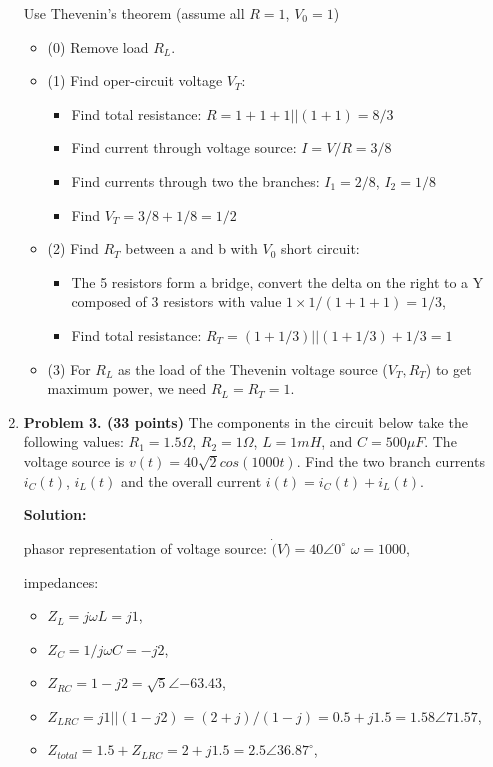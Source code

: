 \begin{enumerate}
 Use Thevenin's theorem (assume all $R=1$, $V_0=1$)
\begin{itemize}
\item (0) Remove load $R_L$.
\item (1) Find oper-circuit voltage $V_T$:
\begin{itemize}
\item Find total resistance: $R=1+1+1||(1+1)=8/3$
\item Find current through voltage source: $I=V/R=3/8$
\item Find currents through two the branches: $I_1=2/8$, $I_2=1/8$
\item Find $V_T=3/8+1/8=1/2$
\end{itemize}
\item (2) Find $R_T$ between a and b with $V_0$ short circuit:
\begin{itemize}
\item The 5 resistors form a bridge, convert the delta on the right
to a Y composed of 3 resistors with value $1 \times 1/(1+1+1)=1/3$, 
\item Find total resistance: $R_T=(1+1/3)||(1+1/3)+1/3=1$
\end{itemize}
\item (3) For $R_L$ as the load of the Thevenin voltage source 
	($V_T, R_T$) to get maximum power, we need $R_L=R_T=1$.
\end{itemize}

\item {\bf Problem 3. (33 points)} 
The components in the circuit below take the following values:
$R_1=1.5\Omega$, $R_2=1\Omega$, $L=1mH$, and $C=500\mu F$. The voltage
source is $v(t)=40\sqrt{2} cos(1000t)$. Find the two branch currents 
$i_C(t)$, $i_L(t)$ and the overall current $i(t)=i_C(t)+i_L(t)$.


{\bf Solution:}

phasor representation of voltage source: $\dot(V)=40\angle{0^\circ}$
$\omega=1000$, 

impedances:
\begin{itemize}
\item $Z_L=j\omega L=j1$, 
\item $Z_C=1/j\omega C=-j2$,
\item $Z_{RC}=1-j2=\sqrt{5}\angle{-63.43}$, 
\item$Z_{LRC}=j1 || (1-j2)=(2+j)/(1-j)=0.5+j1.5=1.58\angle{71.57}$,
\item $Z_{total}=1.5+Z_{LRC}=2+j1.5=2.5\angle{36.87^\circ}$,
\end{itemize}


\end{enumerate}
